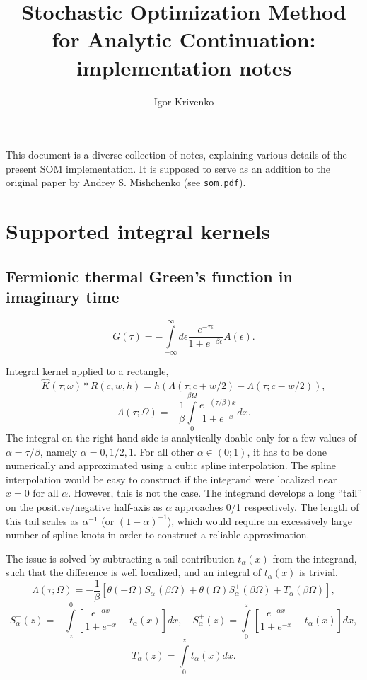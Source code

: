 \documentclass[]{article}
\title{Stochastic Optimization Method for Analytic Continuation: implementation notes}
\author{Igor Krivenko}
\begin{document}
\maketitle

This document is a diverse collection of notes, explaining various details of the present SOM implementation.
It is supposed to serve as an addition to the original paper by Andrey S. Mishchenko (see \verb|som.pdf|).

\section{Supported integral kernels}
\label{kernels}
\subsection{Fermionic thermal Green's function in imaginary time}
\label{fermiongf_imtime}

\begin{equation}
	G(\tau) = -\int\limits_{-\infty}^\infty
	d\epsilon \frac{e^{-\tau\epsilon}}{1+e^{-\beta\epsilon}} A(\epsilon).
\end{equation}

Integral kernel applied to a rectangle,
\begin{equation}
	\hat K(\tau;\omega)*R(c,w,h) =
	h(\Lambda(\tau;c+w/2) - \Lambda(\tau;c-w/2)),
\end{equation}
\begin{equation}
	\Lambda(\tau;\Omega) = -\frac{1}{\beta}
	\int\limits_0^{\beta\Omega}\frac{e^{-(\tau/\beta)x}}{1+e^{-x}}dx.
\end{equation}
The integral on the right hand side is analytically doable only for
a few values of $\alpha=\tau/\beta$, namely $\alpha=0,1/2,1$.
For all other $\alpha\in(0;1)$, it has to be done numerically and approximated using a cubic spline interpolation. The spline interpolation
would be easy to construct if the integrand were localized near $x=0$ for
all $\alpha$. However, this is not the case. The integrand develops
a long ``tail'' on the positive/negative half-axis as $\alpha$ approaches
0/1 respectively. The length of this tail scales as $\alpha^{-1}$ (or $(1-\alpha)^{-1}$), which would require an excessively large number of
spline knots in order to construct a reliable approximation.

The issue is solved by subtracting a tail contribution $t_\alpha(x)$ from the integrand, such that the difference is well localized, and an integral of $t_\alpha(x)$ is trivial.
\begin{equation}
	\Lambda(\tau;\Omega) = -\frac{1}{\beta} \left[
	\theta(-\Omega)S^-_\alpha(\beta\Omega) +
	\theta(\Omega)S^+_\alpha(\beta\Omega) +
	T_\alpha(\beta\Omega)
	\right],
\end{equation}
\begin{equation}
	S^-_\alpha(z) = -\int\limits_z^0
	\left[\frac{e^{-\alpha x}}{1+e^{-x}} - t_\alpha(x)
	\right] dx,\quad
	S^+_\alpha(z) = \int\limits_0^z
	\left[\frac{e^{-\alpha x}}{1+e^{-x}} - t_\alpha(x)
	\right] dx,
\end{equation}
\begin{equation}
	T_\alpha(z) = \int\limits_0^z t_\alpha(x) dx.
\end{equation}
\end{document}

